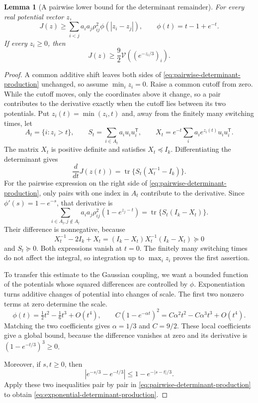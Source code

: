 \documentclass[11pt,a4paper]{article}
\newtheorem{lemma}[theorem]{Lemma}
\theoremstyle{remark}\newtheorem{remark}[theorem]{Remark}
\numberwithin{equation}{section}
\begin{document}
\begin{lemma}[A pairwise lower bound for the determinant remainder]
\label{lem:pairwise-determinant-production}
For every real potential vector $z$,
\begin{equation}\label{eq:pairwise-determinant-production}
 J(z)\ge\sum_{i<j}a_i a_j\rho_{ij}^2
                 \phi(|z_i-z_j|),\qquad \phi(t)=t-1+e^{-t}.
\end{equation}
If every $z_i\ge0$, then
\begin{equation}\label{eq:exponential-determinant-production}
 J(z)\ge\frac92\mathcal V((e^{-z_i/3})_i).
\end{equation}
\end{lemma}
\begin{proof}
A common additive shift leaves both sides of
\eqref{eq:pairwise-determinant-production} unchanged, so assume
$\min_i z_i=0$. Raise a common cutoff from zero. While the cutoff
moves, only the coordinates above it change, so a pair contributes to
the derivative exactly when the cutoff lies between its two potentials.
Put $z_i(t)=\min(z_i,t)$ and, away from the finitely
many switching times, let
\[
 A_t=\{i:z_i>t\},\qquad
 S_t=\sum_{i\in A_t}a_i u_i u_i^{\mathsf T},\qquad
 X_t=e^{-t}\sum_i a_i e^{z_i(t)}u_i u_i^{\mathsf T}.
\]
The matrix $X_t$ is positive definite and satisfies $X_t\preceq I_k$.
Differentiating the determinant gives
\[
 \frac{d}{dt}J(z(t))=\operatorname{tr}\{S_t(X_t^{-1}-I_k)\}.
\]
For the pairwise expression on the right side of
\eqref{eq:pairwise-determinant-production}, only pairs with one index
in $A_t$ contribute to the derivative.  Since $\phi'(s)=1-e^{-s}$,
that derivative is
\[
 \sum_{i\in A_t,j\notin A_t}a_i a_j\rho_{ij}^2(1-e^{z_j-t})
 =\operatorname{tr}\{S_t(I_k-X_t)\}.
\]
Their difference is nonnegative, because
\[
 X_t^{-1}-2I_k+X_t=(I_k-X_t)X_t^{-1}(I_k-X_t)\succeq0
\]
and $S_t\succeq0$.  Both expressions vanish at $t=0$.
The finitely many switching times do not affect the integral, so integration up to $\max_i z_i$ proves the first assertion.

To transfer this estimate to the Gaussian coupling, we want a bounded
function of the potentials whose squared differences are controlled by
\(\phi\). Exponentiation turns additive changes of potential into
changes of scale. The first two nonzero terms at zero determine the scale.
\[
 \phi(t)=\tfrac12t^2-\tfrac16t^3+O(t^4),\qquad
 C(1-e^{-\alpha t})^2=C\alpha^2t^2-C\alpha^3t^3+O(t^4).
\]
Matching the two coefficients gives \(\alpha=1/3\) and \(C=9/2\).
These local coefficients give a global bound, because the difference
vanishes at zero and its derivative is \((1-e^{-t/3})^3\ge0\).

Moreover, if $s,t\ge0$, then
\[
 |e^{-s/3}-e^{-t/3}|\le1-e^{-|s-t|/3}.
\]
Apply these two inequalities pair by pair in
\eqref{eq:pairwise-determinant-production} to obtain
\eqref{eq:exponential-determinant-production}.
\end{proof}
\end{document}
